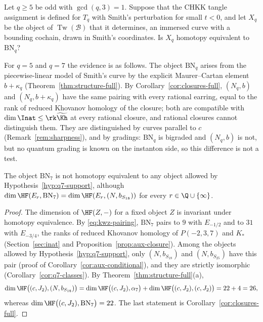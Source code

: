 \begin{question}\label{q:arc-full}
Let $q\ge5$ be odd with $\gcd(q,3)=1$.  Suppose that the CHKK tangle assignment is defined for $T_q$
with Smith's perturbation for small $t<0$, and let $X_q$ be the object of $\operatorname{Tw}(\mathcal
B)$ that it determines, an immersed curve with a bounding cochain, drawn in Smith's coordinates.  Is
$X_q$ homotopy equivalent to $\mathrm{BN}_q$?
\end{question}

For $q=5$ and $q=7$ the evidence is as follows.  The object $\mathrm{BN}_q$ arises from the
piecewise-linear model of Smith's curve by the explicit Maurer--Cartan element $b+\kappa_q$
(Theorem~\ref{thm:structure-full}).  By Corollary~\ref{cor:closures-full}, $(N_q,b)$ and
$(N_q,b+\kappa_q)$ have the same pairing with every rational earring, equal to the rank of reduced
Khovanov homology of the closure; both are compatible with $\dim\Inat\le\rk\widetilde{\Kh}$ at every
rational closure, and rational closures cannot distinguish them.  They are distinguished by curves
parallel to $c$ (Remark~\ref{rem:sharpness}), and by gradings: $\mathrm{BN}_q$ is bigraded
and $(N_q,b)$ is not, but no quantum grading is known on the instanton side, so this difference is not
a test.

\begin{proposition}\label{prop:hyp-conflict}
The object $\mathrm{BN}_7$ is not homotopy equivalent to any object allowed by
Hypothesis~\ref{hyp:q7-support}, although $\dim\HF(E_r,\mathrm{BN}_7)=\dim\HF(E_r,(N,b_{S_{18}}))$ for
every $r\in\Q\cup\{\infty\}$.
\end{proposition}

\begin{proof}
The dimension of $\HF(Z,-)$ for a fixed object $Z$ is invariant under homotopy equivalence.  By
\eqref{eq:kwz-pairing}, $\mathrm{BN}_7$ pairs to $9$ with $E_{-1/2}$ and to $31$ with $E_{-3/4}$, the
ranks of reduced Khovanov homology of $P(-2,3,7)$ and $K_*$ (Section~\ref{sec:inat} and
Proposition~\ref{prop:aux-closure}).
Among the objects allowed by Hypothesis~\ref{hyp:q7-support}, only $(N,b_{S_{18}})$ and
$(N,b_{S_{25}})$ have this pair (proof of Corollary~\ref{cor:aux-conditional}), and they are strictly
isomorphic (Corollary~\ref{cor:q7-classes}).  By Theorem~\ref{thm:structure-full}(a),
\[
 \dim\HF\bigl((c,J_2),(N,b_{S_{18}})\bigr)=\dim\HF\bigl((c,J_2),\alpha_7\bigr)
 +\dim\HF\bigl((c,J_2),(c,J_2)\bigr)=22+4=26,
\]
whereas $\dim\HF\bigl((c,J_2),\mathrm{BN}_7\bigr)=22$.  The last statement is
Corollary~\ref{cor:closures-full}.
\end{proof}

